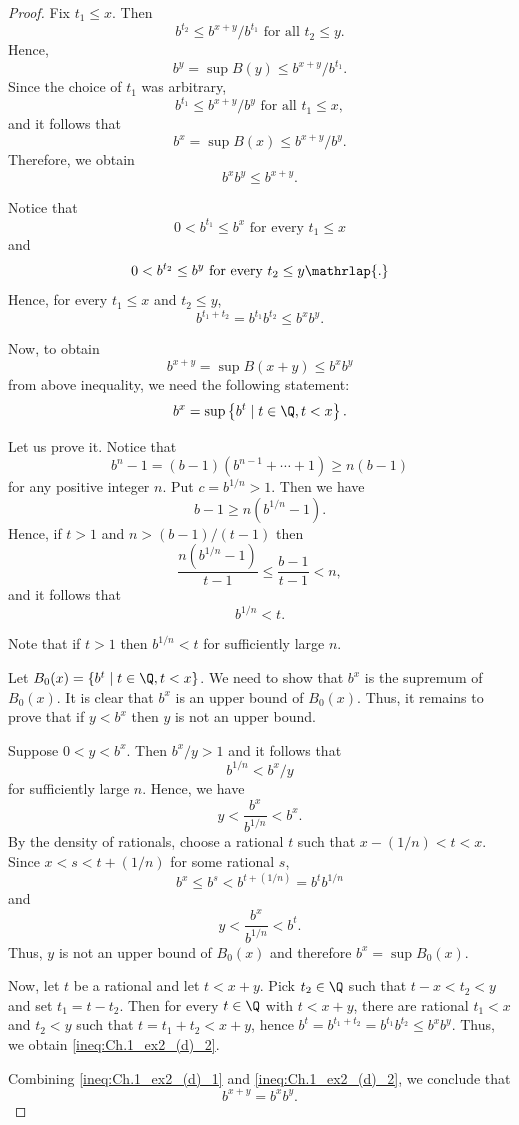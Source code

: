 \begin{proof}
Fix $t_1\leq x$. Then 
\[
b^{t_2} \leq b^{x+y}/b^{t_1} \text{ for all } t_2 \leq y.
\]
Hence, 
\[
b^y = \sup B(y) \leq b^{x+y}/b^{t_1}.
\]
Since the choice of $t_1$ was arbitrary,
\[
b^{t_1} \leq b^{x+y}/b^y \text{ for all } t_1 \leq x,
\]
and it follows that
\[
b^x = \sup B(x) \leq b^{x+y}/b^y.
\]
Therefore, we obtain
\begin{equation} \label{ineq:Ch.1_ex2_(d)_1}
    b^xb^y \leq b^{x+y}.
\end{equation}

Notice that 
\[
0 < b^{t_1} \leq b^x \text{ for every } t_1 \leq x
\]
and 
\[
0 < b^{t_2} \leq b^y \text{ for every } t_2 \leq y \mathrlap{.}
\]
Hence, for every $t_1 \leq x$ and $t_2 \leq y$, 
\[
b^{t_1+t_2} = b^{t_1}b^{t_2} \leq b^xb^y.
\]

Now, to obtain
\begin{equation}\label{ineq:Ch.1_ex2_(d)_2}
b^{x+y} = \sup B(x+y) \leq b^xb^y
\end{equation}
from above inequality, we need the following statement:
\[
b^x=\sup \left\{b^t \mid t \in \Q, t<x\right\}.
\]

Let us prove it. Notice that
\[
b^n-1=(b-1)(b^{n-1}+ \cdots + 1) \geq n(b-1)
\]
for any positive integer $n$. Put $c=b^{1/n}>1$. Then we have
\[
b-1 \geq n(b^{1/n}-1).
\]
Hence, if $t>1$ and $n>(b-1)/(t-1)$ then
\[
\frac{n(b^{1/n}-1)}{t-1} \leq \frac{b-1}{t-1} < n,
\]
and it follows that
\[
b^{1/n}<t.
\]

Note that if $t>1$ then $b^{1/n}<t$ for sufficiently large $n$.

Let $B_0(x)=\left\{b^t \mid t \in \Q, t<x\right\}$.
We need to show that $b^x$ is the supremum of $B_0(x)$. 
It is clear that $b^x$ is an upper bound of $B_0(x)$.
Thus, it remains to prove that if $y<b^x$ then $y$ is not an upper bound.

Suppose $0<y<b^x$. Then $b^x/y >1$ and it follows that
\[
b^{1/n} <b^x/y
\]
for sufficiently large $n$. 
Hence, we have
\[
y<\frac{b^x}{b^{1/n}}<b^x.
\]
By the density of rationals, choose a rational $t$ such that $x-(1/n)<t<x$. 
Since $x<s<t+(1/n)$ for some rational $s$, 
\[
b^x \leq b^s <b^{t+(1/n)} = b^tb^{1/n}
\]
and
\[
y<\frac{b^x}{b^{1/n}}<b^t.
\]
Thus, $y$ is not an upper bound of $B_0(x)$ and therefore $b^x = \sup B_0(x)$.

Now, let $t$ be a rational and let $t<x+y$.
Pick $t_2 \in \Q$ such that $t-x<t_2<y$ and set $t_1=t-t_2$.
Then for every $t \in \Q$ with $t<x+y$, there are rational $t_1<x$ and $t_2<y$ such that $t=t_1+t_2<x+y$, hence $b^t=b^{t_1+t_2}=b^{t_1}b^{t_2} \leq b^xb^y$.
Thus, we obtain \eqref{ineq:Ch.1_ex2_(d)_2}.

Combining \eqref{ineq:Ch.1_ex2_(d)_1} and \eqref{ineq:Ch.1_ex2_(d)_2}, we conclude that
\[
b^{x+y}=b^xb^y.
\]
\end{proof}
